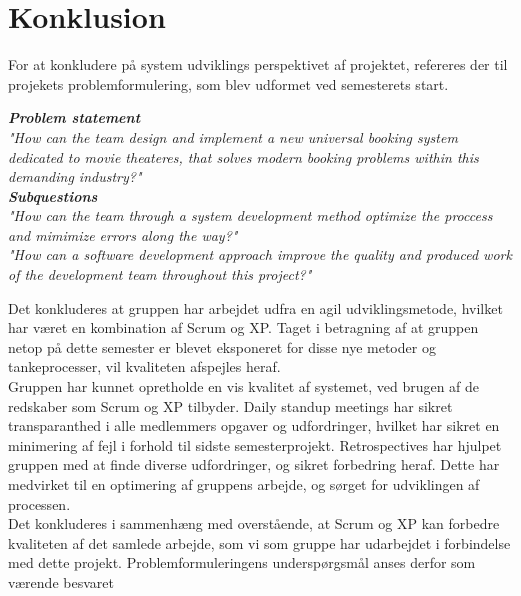 \chapter{Konklusion}\label{ch:konklusion}
For at konkludere på system udviklings perspektivet af projektet, refereres der til projekets problemformulering,
som blev udformet ved semesterets start.

\begin{center}
\textit{\textbf{Problem statement} \\
"How can the team design and implement a new universal booking system dedicated to movie theateres, 
that solves modern booking problems within this demanding industry?"} \\

\textit{\textbf{Subquestions}\\
"How can the team through a system development method optimize the proccess and mimimize errors along the way?"}\\

\textit{"How can a software development approach improve the quality and 
produced work of the development team throughout this project?"}\\
\end{center} 

Det konkluderes at gruppen har arbejdet udfra en agil udviklingsmetode, hvilket har været en kombination af Scrum og XP.
Taget i betragning af at gruppen netop på dette semester er blevet eksponeret for disse nye metoder og tankeprocesser,
vil kvaliteten afspejles heraf. \\

Gruppen har kunnet opretholde en vis kvalitet af systemet, ved brugen af de redskaber som Scrum og XP tilbyder.
Daily standup meetings har sikret transparanthed i alle medlemmers opgaver og udfordringer, hvilket har sikret
en minimering af fejl i forhold til sidste semesterprojekt. 
Retrospectives har hjulpet gruppen med at finde diverse udfordringer, og sikret forbedring heraf. Dette har medvirket
til en optimering af gruppens arbejde, og sørget for udviklingen af processen. \\

Det konkluderes i sammenhæng med overstående, at Scrum og XP kan forbedre kvaliteten af det samlede arbejde, 
som vi som gruppe har udarbejdet i forbindelse med dette projekt. Problemformuleringens underspørgsmål anses derfor
som værende besvaret